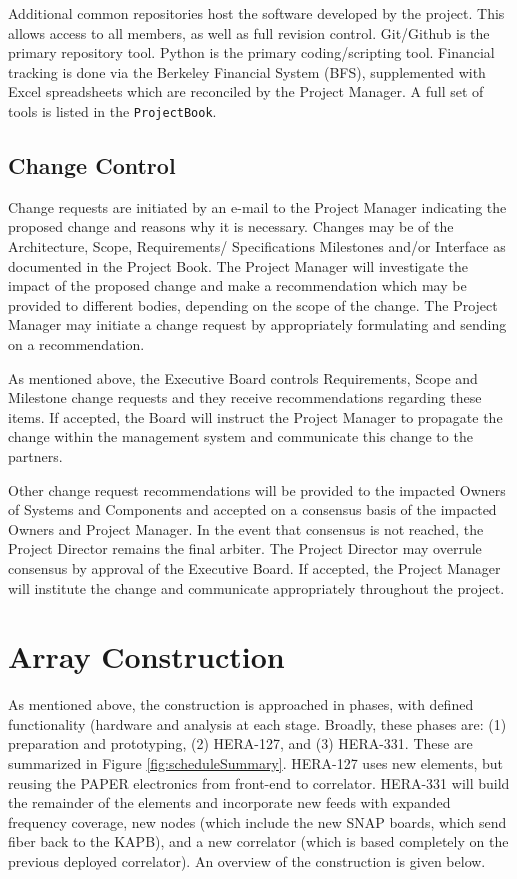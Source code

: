 \documentclass[preprint]{aastex}
\begin{document}
Additional common repositories host the software developed by the project.  This allows access to all members,
as well as full revision control.  Git/Github is the primary repository tool.  Python is the primary coding/scripting
tool.  Financial tracking is done via the Berkeley Financial System (BFS), supplemented with Excel spreadsheets which are
reconciled by the Project Manager.  A full set of tools is listed in the {\tt ProjectBook}.

\subsection{Change Control}
\label{sec:changecontrol}
Change requests are initiated by an e-mail to the Project Manager indicating the proposed change
and reasons why it is necessary.  Changes may be of the Architecture, Scope, Requirements/ Specifications
Milestones and/or Interface as documented in the Project Book.  The Project Manager will investigate the 
impact of the proposed change and make a recommendation which may be provided to different bodies, 
depending on the scope of the change.  The Project Manager may initiate a change request by appropriately 
formulating and sending on a recommendation.

As mentioned above, the Executive Board controls Requirements, Scope and Milestone change requests
and they receive recommendations regarding these items.  If accepted, the Board will instruct the Project Manager to 
propagate the change within the management system and communicate this change to the partners.

Other change request recommendations will be provided to the impacted Owners of Systems and
Components and accepted on a consensus basis of the impacted Owners and Project Manager.  
In the event that consensus is not reached, the Project Director remains the final arbiter.  The Project 
Director may overrule consensus by approval of the Executive Board.  If accepted, the Project Manager 
will institute the change and communicate appropriately throughout the project.

\section{Array Construction}
\label{sec:construction}
As mentioned above, the construction is approached in phases, with defined functionality (hardware 
and analysis at each stage.  Broadly, these phases are:  (1) preparation and prototyping, (2) HERA-127, 
and (3) HERA-331.  These are summarized in Figure \ref{fig:scheduleSummary}.   HERA-127 uses new
elements, but reusing the PAPER electronics from front-end to correlator.  HERA-331 will build the 
remainder of the elements and incorporate new feeds with expanded frequency coverage, new nodes
(which include the new SNAP boards, which send fiber back to the KAPB), and a new correlator (which
is based completely on the previous deployed correlator).
An overview of the construction is given below.
\end{document}
